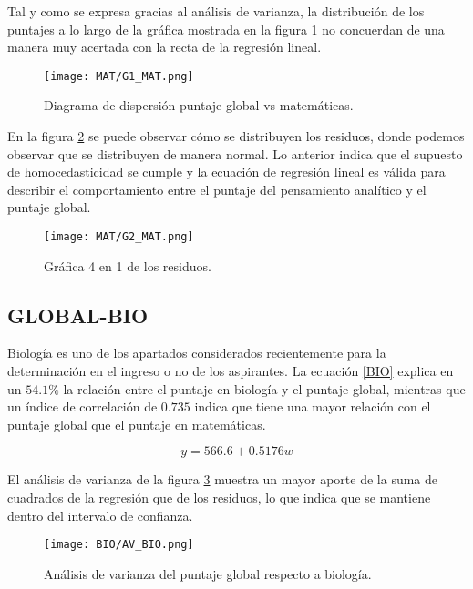 \documentclass{article}
\begin{document}
Tal y como se expresa gracias al análisis de varianza, la distribución de los puntajes a lo largo de la gráfica mostrada en la figura \ref{fig:G1_MAT} no concuerdan de una manera muy acertada con la recta de la regresión lineal.

\begin{figure}[H]
    \centering
    \texttt{[image: MAT/G1\_MAT.png]}
    \caption{Diagrama de dispersión puntaje global vs matemáticas.}
    \label{fig:G1_MAT}
\end{figure}

En la figura \ref{fig:G2_MAT} se puede observar cómo se distribuyen los residuos, donde podemos observar que se distribuyen de manera normal. Lo anterior indica que el supuesto de homocedasticidad se cumple y la ecuación de regresión lineal es válida para describir el comportamiento entre el puntaje del pensamiento analítico y el puntaje global.

\begin{figure}[H]
    \centering
    \texttt{[image: MAT/G2\_MAT.png]}
    \caption{Gráfica 4 en 1 de los residuos.}
    \label{fig:G2_MAT}
\end{figure}

\subsection{GLOBAL-BIO}

Biología es uno de los apartados considerados recientemente para la determinación en el ingreso o no de los aspirantes. La ecuación \ref{BIO} explica en un $54.1\%$ la relación entre el puntaje en biología y el puntaje global, mientras que un índice de correlación de $0.735$ indica que tiene una mayor relación con el puntaje global que el puntaje en matemáticas.

\begin{equation}
    y = 566.6 + 0.5176w
    \label{BIO}
\end{equation}

El análisis de varianza de la figura \ref{fig:AV_BIO} muestra un mayor aporte de la suma de cuadrados de la regresión que de los residuos, lo que indica que se mantiene dentro del intervalo de confianza.

\begin{figure}[H]
    \centering
    \texttt{[image: BIO/AV\_BIO.png]}
    \caption{Análisis de varianza del puntaje global respecto a biología.}
    \label{fig:AV_BIO}
\end{figure}
\end{document}
